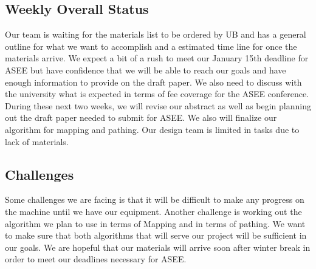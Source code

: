 
\subsection{Weekly Overall Status}
Our team is waiting for the materials list to be ordered by UB and has a general outline for what we want to accomplish and a estimated time line for once the materials arrive. We expect a bit of a rush to meet our January 15th deadline for ASEE but have confidence that we will be able to reach our goals and have enough information to provide on the draft paper. We also need to discuss with the university what is expected in terms of fee coverage for the ASEE conference. During these next two weeks, we will revise our abstract as well as begin planning out the draft paper needed to submit for ASEE. We also will finalize our algorithm for mapping and pathing. Our design team is limited in tasks due to lack of materials. \par

\subsection{Challenges}
Some challenges we are facing is that it will be difficult to make any progress on the machine until we have our equipment. Another challenge is working out the algorithm we plan to use in terms of Mapping and in terms of pathing. We want to make sure that both algorithms that will serve our project will be sufficient in our goals. We are hopeful that our materials will arrive soon after winter break in order to meet our deadlines necessary for ASEE.


